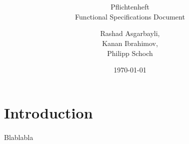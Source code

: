 \documentclass[hidelinks, a4paper, 11pt]{scrartcl}
\author{Rashad Asgarbayli,\\ Kanan Ibrahimov,\\ Philipp Schoch}
\title{\vspace{3cm}
\app
\vspace{20mm}}
\subtitle{Pflichtenheft\\ Functional Specifications Document}
\date{\today}
\begin{document}
\maketitle
\thispagestyle{empty}

\newpage

\tableofcontents

\newpage


\section{Introduction}

\paragraph{}Blablabla




















\end{document}
